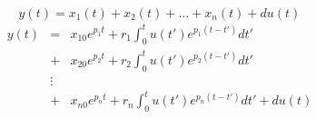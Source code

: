 \[ y(t) = x_1(t) + x_2(t) + ... + x_n(t) + du(t) \]
\begin{eqnarray*}
	y(t) & = & x_{10}e^{p_1t}+r_1\int_0^tu(t')e^{p_1(t-t')}dt'  \\
         & + &	x_{20}e^{p_2t}+r_2\int_0^tu(t')e^{p_2(t-t')}dt' \\
	     & \vdots & \\
	     & + & x_{n0}e^{p_nt}+r_n\int_0^tu(t')e^{p_n(t-t')}dt' + du(t)
\end{eqnarray*}

\endinput

